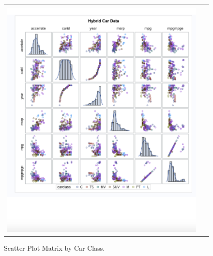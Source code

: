 \documentclass[acmsmall]{acmart}
\begin{document}
\begin{figure}[H] %
	\centering
	\begin{tabular}{| p{}|}
	\hline
	\\
	\includegraphics[width=0.95\textwidth]{../graphics/ScatterPlot}\\
	\hline
	\end{tabular}	
	\caption{Scatter Plot Matrix by Car Class.} %
	\label{fig:SCAT}
\end{figure}
\end{document}
